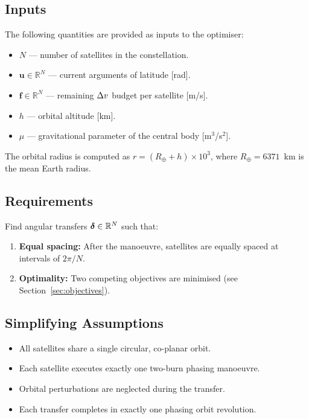 \subsection{Inputs}

The following quantities are provided as inputs to the optimiser:
\begin{itemize}
  \item $N$ --- number of satellites in the constellation.
  \item $\mathbf{u} \in \mathbb{R}^N$ --- current arguments of latitude [rad].
  \item $\mathbf{f} \in \mathbb{R}^N$ --- remaining $\Delta v$ budget per satellite [m/s].
  \item $h$ --- orbital altitude [km].
  \item $\mu$ --- gravitational parameter of the central body [m$^3$/s$^2$].
\end{itemize}
The orbital radius is computed as $r = (R_\oplus + h) \times 10^3$,
where $R_\oplus = 6371$~km is the mean Earth radius.

\subsection{Requirements}

Find angular transfers $\boldsymbol{\delta} \in \mathbb{R}^N$ such that:
\begin{enumerate}
  \item \textbf{Equal spacing:} After the manoeuvre, satellites are
        equally spaced at intervals of $2\pi/N$.
  \item \textbf{Optimality:} Two competing objectives are minimised
        (see Section~\ref{sec:objectives}).
\end{enumerate}

\subsection{Simplifying Assumptions}

\begin{itemize}
  \item All satellites share a single circular, co-planar orbit.
  \item Each satellite executes exactly one two-burn phasing manoeuvre.
  \item Orbital perturbations are neglected during the transfer.
  \item Each transfer completes in exactly one phasing orbit revolution.
\end{itemize}

